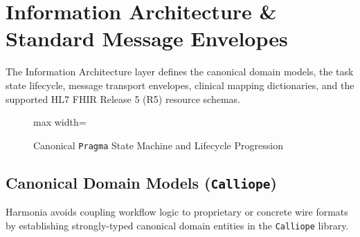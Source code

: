 
\chapter[Information Architecture \& Standard Message Envelopes]{Information Architecture \&\\Standard Message Envelopes}
\label{chap:information_architecture}

The Information Architecture layer defines the canonical domain models, the task state lifecycle, message transport envelopes, clinical mapping dictionaries, and the supported HL7 FHIR Release 5 (R5) resource schemas.

\begin{figure}[htbp]
    \centering
    \begin{adjustbox}{max width=\textwidth}
        
    \end{adjustbox}
    \caption{Canonical \texttt{Pragma} State Machine and Lifecycle Progression}
    \label{fig:info_pragma_state_flow}
\end{figure}

\section{Canonical Domain Models (\texttt{Calliope})}

Harmonia avoids coupling workflow logic to proprietary or concrete wire formats by establishing strongly-typed canonical domain entities in the \texttt{Calliope} library.

